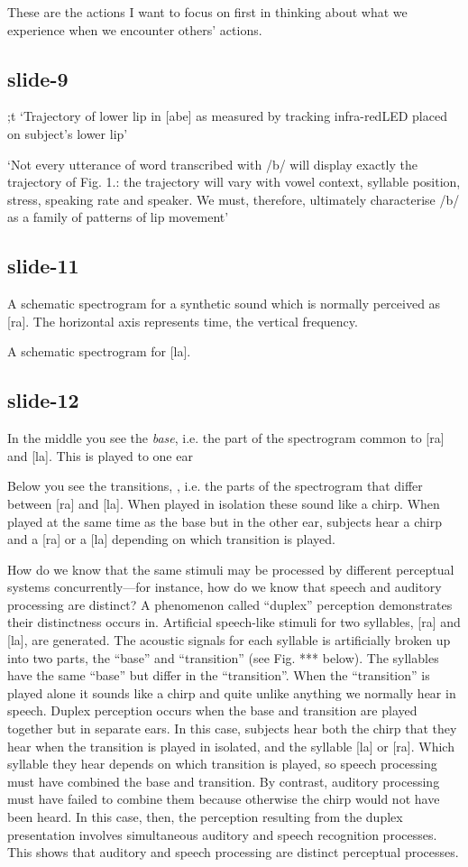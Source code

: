 \documentclass[12pt,\papersize]{extarticle}
\begin{document}
These are the actions I want to focus on first in thinking about
what we experience when we encounter others’ actions.

\subsection{slide-9}
;t
          ‘Trajectory of lower lip in [abe] as measured by tracking infra-redLED placed on subject's lower lip’

‘Not every utterance of word transcribed with /b/ will display exactly the trajectory
of Fig. 1.: the trajectory will vary with vowel context, syllable position,
stress, speaking rate and speaker.
We must, therefore, ultimately characterise /b/ as a family of patterns of lip
movement’
\citep[p.~224]{browman:1986_towards}

\subsection{slide-11}
A schematic spectrogram for a synthetic sound which is normally perceived as [ra]. The horizontal
axis represents time, the vertical frequency.

A schematic spectrogram for [la].

\subsection{slide-12}
In the middle you see the \emph{base}, i.e. the part of the spectrogram common to [ra] and [la]. This
is played to one ear

Below you see the transitions, , i.e. the parts of the spectrogram that differ between [ra] and [la].
When played in isolation these sound like a chirp. When played at the same time as the base but in
the other ear, subjects hear a chirp and a [ra] or a [la] depending on which transition is played.

How do we know that the same stimuli may be processed by different perceptual systems
concurrently—for instance, how do we know that speech and auditory processing are distinct? A
phenomenon called “duplex” perception demonstrates their distinctness occurs in. Artificial
speech-like stimuli for two syllables, [ra] and [la], are generated. The acoustic signals for each
syllable is artificially broken up into two parts, the “base” and “transition” (see Fig. *** below).
The syllables have the same “base” but differ in the “transition”. When the “transition” is played
alone it sounds like a chirp and quite unlike anything we normally hear in speech. Duplex perception
occurs when the base and transition are played together but in separate ears. In this case, subjects
hear both the chirp that they hear when the transition is played in isolated, and the syllable [la]
or [ra]. Which syllable they hear depends on which transition is played, so speech processing must
have combined the base and transition. By contrast, auditory processing must have failed to combine
them because otherwise the chirp would not have been heard. In this case, then, the perception
resulting from the duplex presentation involves simultaneous auditory and speech recognition
processes. This shows that auditory and speech processing are distinct perceptual processes.
\end{document}

